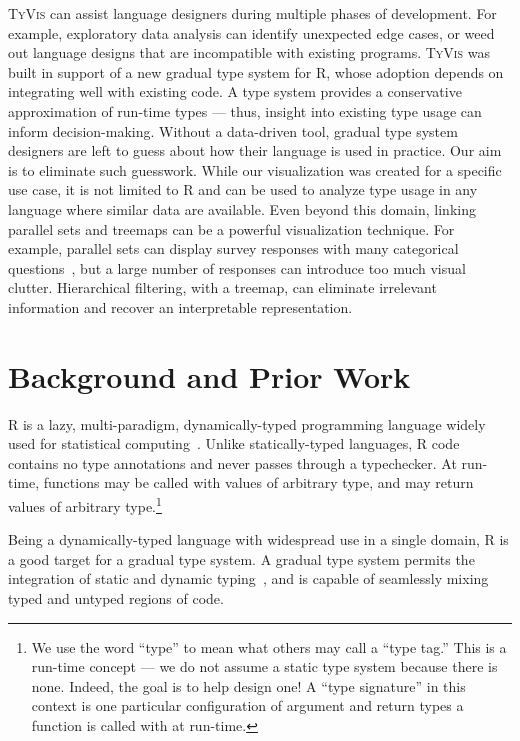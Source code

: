 \documentclass{vgtc}                          %
\newcommand{\ourmethodplaintext}{\textsc{TyVis}\xspace}
\newcommand{\ourmethod}{{\sc \ourmethodplaintext}\xspace}
\begin{document}
\ourmethod can assist language designers during multiple phases of development.
For example, exploratory data analysis can identify unexpected edge cases, or weed out language designs that are incompatible with existing programs.
\ourmethod was built in support of a new gradual type system for R, whose adoption depends on integrating well with existing code.
A type system provides a conservative approximation of run-time types --- thus, insight into existing type usage can inform decision-making.
Without a data-driven tool, gradual type system designers are left to guess about how their language is used in practice.
Our aim is to eliminate such guesswork.
While our visualization was created for a specific use case, it is not limited to R and can be used to analyze type usage in any language where similar data are available.
Even beyond this domain, linking parallel sets and treemaps can be a powerful visualization technique.
For example, parallel sets can display survey responses with many categorical questions~\cite{kosara:2006}, but a large number of responses can introduce too much visual clutter.
Hierarchical filtering, with a treemap, can eliminate irrelevant information and recover an interpretable representation.


\section{Background and Prior Work}

R is a lazy, multi-paradigm, dynamically-typed programming language widely used for statistical computing~\cite{morandat:2012}.
Unlike statically-typed languages, R code contains no type annotations and never passes through a typechecker.
At run-time, functions may be called with values of arbitrary type, and may return values of arbitrary type.\footnote{
  We use the word ``type'' to mean what others may call a ``type tag.''
  This is a run-time concept --- we do not assume a static type system   because there is none.
  Indeed, the goal is to help design one!
  A ``type signature'' in this context is one particular configuration of argument and return types a function is called with at run-time.
}

Being a dynamically-typed language with widespread use in a single domain, R is a good target for a gradual type system.
A gradual type system permits the integration of static and dynamic typing~\cite{siek:2006,tobin-hochstadt:2006}, and is capable of seamlessly mixing typed and untyped regions of code.
\end{document}
